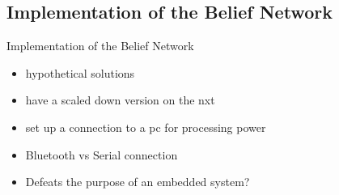 \subsection{Implementation of the Belief Network}
\begin{frame}{Implementation of the Belief Network}

\begin{itemize}
\item hypothetical solutions
\item have a scaled down version on the nxt
\item set up a connection to a pc for processing power

   \item Bluetooth vs Serial connection
   \item Defeats the purpose of an embedded system?
\end{itemize}

\end{frame}
